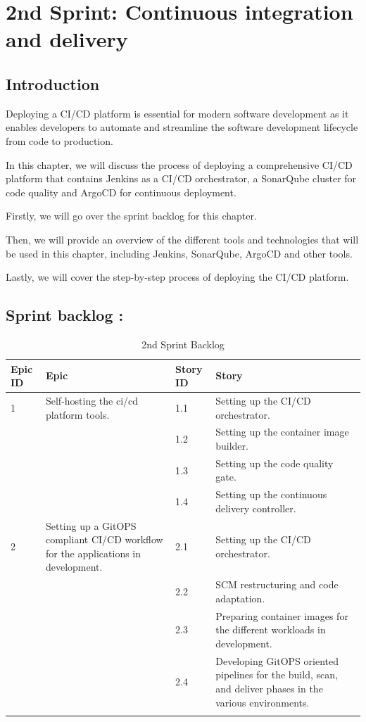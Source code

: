 \graphicspath{{./assets/}}
\setcounter{mtc}{3}
\chapter{2nd Sprint: Continuous integration and delivery }

\minitoc
\newpage
\section*{Introduction}
Deploying a CI/CD platform is essential for modern software development as it enables developers to automate and streamline the software development lifecycle from code to production. 

In this chapter, we will discuss the process of deploying a comprehensive CI/CD platform that contains Jenkins as a CI/CD orchestrator, a SonarQube cluster for code quality and ArgoCD for continuous deployment. 

Firstly, we will go over the sprint backlog for this chapter. 

Then, we will provide an overview of the different tools and technologies that will be used in this chapter, including Jenkins, SonarQube, ArgoCD and other tools. 

Lastly, we will cover the step-by-step process of deploying the CI/CD platform.

\section{Sprint backlog :}

\begin{longtable}[H]{|m{1.5cm}|m{3cm}|m{1.5cm}|m{9cm}|}
\hline
{\textbf{Epic ID}} & {\textbf{Epic}} & {\textbf{Story ID}} & {\textbf{Story}}\\
\hline
1  & Self-hosting the ci/cd platform tools.  &  1.1	 & Setting up the CI/CD orchestrator.\\
\cline{3-4}
& & 1.2 & Setting up the container image builder. \\
\cline{3-4}
& & 1.3	& Setting up the code quality gate. \\
\cline{3-4}
& & 1.4	& Setting up the continuous delivery controller. \\
\cline{3-4}
\hline
2  & Setting up a GitOPS compliant CI/CD workflow for the applications in development.  &  2.1	 & Setting up the CI/CD orchestrator.\\
\cline{3-4}
& & 2.2 & SCM restructuring and code adaptation. \\
\cline{3-4}
& & 2.3	& Preparing container images for the different workloads in development.  \\
\cline{3-4}
& & 2.4	& Developing GitOPS oriented pipelines for the build, scan, and deliver phases in the various environments.  \\
\cline{3-4}
\hline
\caption{2nd Sprint Backlog}
\end{longtable}

